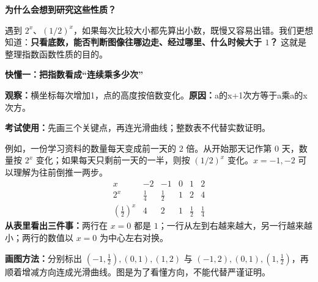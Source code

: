 \clearpage
\begin{explanationbox}

\textbf{\textcolor{CExplanation}{为什么会想到研究这些性质？}}

遇到 $2^x$、$(1/2)^x$，如果每次比较大小都先算出小数，既慢又容易出错。我们更想知道：\textbf{只看底数，能否判断图像往哪边走、经过哪里、什么时候大于 $1$？} 这就是整理指数函数性质的目的。

\medskip
\textbf{\textcolor{CExplanation}{快懂一：把指数看成“连续乘多少次”}}

\textbf{观察：}横坐标每次增加1，点的高度按倍数变化。\quad\textbf{原因：}a的x+1次方等于a乘a的x次方。

\textbf{考试使用：}先画三个关键点，再连光滑曲线；整数表不代替实数证明。



例如，一份学习资料的数量每天变成前一天的 $2$ 倍。从开始那天记作第 $0$ 天，数量按 $2^x$ 变化；如果每天只剩前一天的一半，则按 $(1/2)^x$ 变化。$x=-1,-2$ 可以理解为往前倒推一两步。
\[
\begin{array}{c|ccccc}
    x & -2&-1&0&1&2\\\hline
    2^x & \frac14&\frac12&1&2&4\\
    (\frac12)^x &4&2&1&\frac12&\frac14
\end{array}
\]
\textbf{从表里看出三件事：}两行在 $x=0$ 都是 $1$；一行从左到右越来越大，另一行越来越小；两行的数值以 $x=0$ 为中心左右对换。

\end{explanationbox}
\clearpage
\begin{explanationbox}
\begin{center}
\end{center}
\textbf{画图方法：}分别标出 $(-1,\frac12),(0,1),(1,2)$ 与 $(-1,2),(0,1),(1,\frac12)$，再顺着增减方向连成光滑曲线。图是为了看懂方向，不能代替严谨证明。

\medskip

\end{explanationbox}
